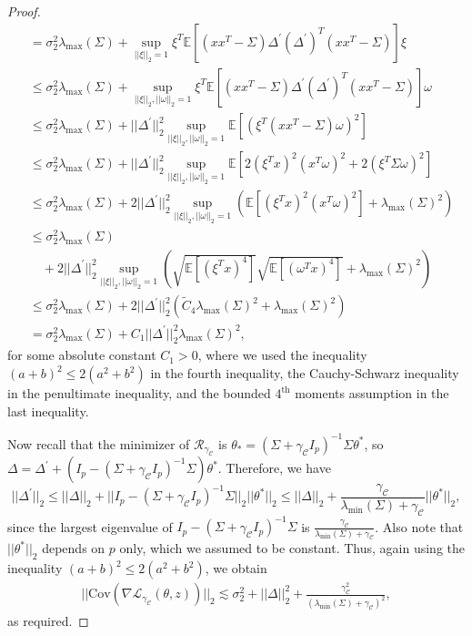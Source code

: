\documentclass{article}
\begin{document}
\begin{proof}
\begin{align*}
&= \sigma_2^2\lambda_{\max}(\Sigma) + \mathop{\sup}\limits_{||\xi||_2 = 1}\xi^T\mathbb{E}[(xx^T - \Sigma)\Delta^{'}(\Delta^{'})^T(xx^T - \Sigma)]\xi\\
&\leq \sigma_2^2\lambda_{\max}(\Sigma) + \mathop{\sup}\limits_{||\xi||_2, ||\omega||_2 = 1}\xi^T\mathbb{E}[(xx^T - \Sigma)\Delta^{'}(\Delta^{'})^T(xx^T - \Sigma)]\omega\\
&\leq \sigma_2^2\lambda_{\max}(\Sigma) + ||\Delta^{'}||_2^2\mathop{\sup}\limits_{||\xi||_2, ||\omega||_2 = 1}\mathbb{E}[(\xi^T(xx^T - \Sigma)\omega)^2]\\
&\leq \sigma_2^2\lambda_{\max}(\Sigma) + ||\Delta^{'}||_2^2\mathop{\sup}\limits_{||\xi||_2, ||\omega||_2 = 1}\mathbb{E}[2(\xi^Tx)^2(x^T\omega)^2 + 2(\xi^T\Sigma\omega)^2]\\
&\leq \sigma_2^2\lambda_{\max}(\Sigma) + 2||\Delta^{'}||_2^2\mathop{\sup}\limits_{||\xi||_2, ||\omega||_2 = 1}\left(\mathbb{E}[(\xi^Tx)^2(x^T\omega)^2] + \lambda_{\max}(\Sigma)^2\right)\\
&\leq \sigma_2^2\lambda_{\max}(\Sigma)\\
& \quad + 2||\Delta^{'}||_2^2\mathop{\sup}\limits_{||\xi||_2, ||\omega||_2 = 1}\left(\sqrt{\mathbb{E}[(\xi^Tx)^4]}\sqrt{\mathbb{E}[(\omega^Tx)^4]} + \lambda_{\max}(\Sigma)^2\right)\\
&\leq \sigma_2^2\lambda_{\max}(\Sigma) + 2||\Delta^{'}||_2^2\left(\widetilde{C}_4\lambda_{\max}(\Sigma)^2 + \lambda_{\max}(\Sigma)^2\right) \\
%
& = \sigma_2^2\lambda_{\max}(\Sigma) + C_1||\Delta^{'}||_2^2\lambda_{\max}(\Sigma)^2,
\end{align*}
for some absolute constant $C_1 > 0$, where we used the inequality $(a + b)^2 \leq 2(a^2 + b^2)$ in the fourth inequality, the Cauchy-Schwarz inequality in the penultimate inequality, and the bounded $4^{\text{th}}$ moments assumption in the last inequality.

Now recall that the minimizer of $\mathcal{R}_{\gamma_{\mathcal{C}}}$ is $\theta_{*} = (\Sigma + \gamma_{\mathcal{C}} I_p)^{-1}\Sigma\theta^*$, so $\Delta = \Delta^{'} + (I_p - (\Sigma + \gamma_{\mathcal{C}} I_p)^{-1}\Sigma)\theta^*$. Therefore, we have $$||\Delta^{'}||_2 \leq ||\Delta||_2 + ||I_p - (\Sigma + \gamma_{\mathcal{C}} I_p)^{-1}\Sigma||_2||\theta^*||_2 \leq ||\Delta||_2 + \frac{\gamma_{\mathcal{C}}}{\lambda_{\min}(\Sigma) + \gamma_{\mathcal{C}}}||\theta^*||_2,$$
since the largest eigenvalue of $I_p - (\Sigma + \gamma_{\mathcal{C}} I_p)^{-1}\Sigma$ is $\frac{\gamma_{\mathcal{C}}}{\lambda_{\min}(\Sigma) + \gamma_{\mathcal{C}}}$. Also note that $||\theta^*||_2$ depends on $p$ only, which we assumed to be constant. Thus, again using the inequality $(a + b)^2 \leq 2(a^2 + b^2)$, we obtain
\begin{align*}
||\mathrm{\mathrm{Cov}}(\nabla \mathcal{L}_{\gamma_{\mathcal{C}}}(\theta, z))||_2 \lesssim \sigma_2^2 + ||\Delta||_2^2 + \frac{\gamma_{\mathcal{C}}^2}{(\lambda_{\min}(\Sigma) + \gamma_{\mathcal{C}})^2},
\end{align*}
as required.
\end{proof}
\end{document}
